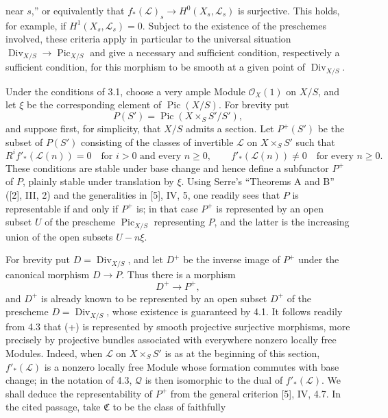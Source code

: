 near $s$,” or equivalently
that $f_*(\mathcal L)_s\longrightarrow H^0(X_s,\mathcal L_s)$ is surjective.
This holds, for example, if $H^1(X_s,\mathcal L_s)=0$. Subject to the existence
of the preschemes involved, these criteria apply in particular to the
universal situation
$\operatorname{Div}_{X/S}\longrightarrow\operatorname{Pic}_{X/S}$ and give a
necessary and sufficient condition, respectively a sufficient condition, for
this morphism to be smooth at a given point of $\operatorname{Div}_{X/S}$.


Under the conditions of 3.1, choose a very ample Module $\mathcal O_X(1)$ on
$X/S$, and let $\xi$ be the corresponding element of
$\operatorname{Pic}(X/S)$. For brevity put
\[
P(S')=\operatorname{Pic}(X\times_SS'/S'),
\]
and suppose first, for simplicity, that $X/S$ admits a section. Let $P^+(S')$
be the subset of $P(S')$ consisting of the classes of invertible $\mathcal L$
on $X\times_SS'$ such that
\[
R^if'_*(\mathcal L(n))=0\quad\text{for $i>0$ and every $n\geq0$},
\qquad
f'_*(\mathcal L(n))\neq0\quad\text{for every $n\geq0$}.
\]
These conditions are stable under base change and hence define a subfunctor
$P^+$ of $P$, plainly stable under translation by $\xi$. Using Serre's
“Theorems A and B” ([2], III, 2) and the generalities in [5], IV, 5, one readily
sees that $P$ is representable if and only if $P^+$ is; in that case $P^+$ is
represented by an open subset $U$ of the prescheme
$\operatorname{Pic}_{X/S}$ representing $P$, and the latter is the increasing
union of the open subsets $U-n\xi$.

For brevity put $D=\operatorname{Div}_{X/S}$, and let $D^+$ be the inverse
image of $P^+$ under the canonical morphism $D\longrightarrow P$. Thus there
is a morphism
\begin{equation}
D^+\longrightarrow P^+,
\tag{+}
\end{equation}
and $D^+$ is already known to be represented by an open subset $D^+$ of the
prescheme $D=\operatorname{Div}_{X/S}$, whose existence is guaranteed by 4.1.
It follows readily from 4.3 that (+) is represented by smooth projective
surjective morphisms, more precisely by projective bundles associated with
everywhere nonzero locally free Modules. Indeed, when $\mathcal L$ on
$X\times_SS'$ is as at the beginning of this section, $f'_*(\mathcal L)$ is a
nonzero locally free Module whose formation commutes with base change; in the
notation of 4.3, $\mathcal Q$ is then isomorphic to the dual of
$f'_*(\mathcal L)$. We shall deduce the representability of $P^+$ from the
general criterion [5], IV, 4.7. In the cited passage, take $\mathfrak C$ to be
the class of faithfully

